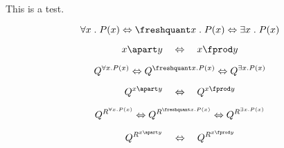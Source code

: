 \documentclass[10pt]{article}
\newcommand{\do}[1]{}
\newcommand{\linei}{
\do{\forall x \mathrel{.} P(x)}
\Leftrightarrow \do{\freshquant x \mathrel{.} P(x)}
\Leftrightarrow \do{\exists x \mathrel{.} P(x)}
}
\newcommand{\lineii}{
\do{x\apart y} \quad \Leftrightarrow \quad \do{x\fprod y}
}
\begin{document}
This is a test.

\renewcommand{\do}[1]{#1}
\[
\linei
\]

\[
\lineii
\]

\renewcommand{\do}[1]{Q^{#1}}
\[
\linei
\]

\[
\lineii
\]


\renewcommand{\do}[1]{Q^{R^{#1}}}
\[
\linei
\]

\[
\lineii
\]
\end{document}
